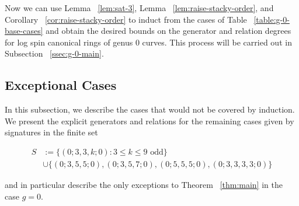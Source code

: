 \documentclass{amsart}
\theoremstyle{plain}
\theoremstyle{definition}
\theoremstyle{remark}
\numberwithin{equation}{section}
\newcommand\ssec{\subsection}
\newcommand\sx{\mathscr X}
\begin{document}
Now we can use Lemma ~\ref{lem:sat-3}, Lemma
~\ref{lem:raise-stacky-order}, and Corollary
~\ref{cor:raise-stacky-order} to induct from the cases of Table
~\ref{table:g-0-base-cases} and obtain the desired bounds on the
generator and relation degrees for log spin canonical rings of
genus 0 curves. This process will be carried out in Subsection
~\ref{ssec:g-0-main}.


\ssec{Exceptional Cases}
\label{ssec:g-0-exceptional}
In this subsection, we describe the cases that would not be covered by induction.
We present the explicit generators and relations for the remaining
cases given by signatures in the finite set

\begin{align*}
	S &:= \{(0; 3, 3, k; 0) : 3 \leq k \leq 9 \text{ odd}\} \\
		&\cup \{(0; 3, 5, 5; 0) ,(0; 3, 5, 7; 0), (0; 5, 5, 5; 0), (0; 3, 3, 3, 3; 0)\}
\end{align*}

\noindent
and in particular describe the only exceptions to Theorem ~\ref{thm:main}
in the case $g = 0$.  
\end{document}
